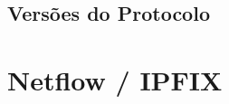 \documentclass[12pt, brazil, ruledheader, pnumromarab,normaltoc]{abnt}
\begin{document}
\subsection{Versões do Protocolo}

%

\section{Netflow / IPFIX} \label{sec:netflow}
\end{document}
